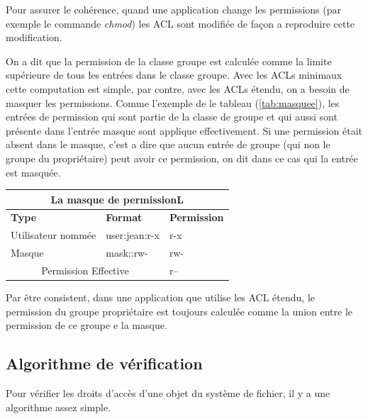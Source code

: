  
Pour assurer le cohérence, quand une application change les permissions (par exemple le commande \emph{chmod}) les ACL sont modifiée de façon a reproduire cette modification.
 
On a dit que la permission de la classe groupe est calculée comme la limite supérieure de tous les entrées dans le classe groupe. Avec les ACLs minimaux cette computation est simple, par contre, avec les ACLs étendu, on a besoin de masquer les permissions. Comme l'exemple de le tableau (\ref{tab:masquee}), les entrées de permission qui sont partie de la classe de groupe et qui aussi sont présente dans l'entrée masque sont applique effectivement. Si une permission était absent dans le masque, c'est a dire que aucun entrée de groupe (qui non le groupe du propriétaire) peut avoir ce permission, on dit dans ce cas qui la entrée est masquée.
 
\begin{center}
\begin{tabular}{|l|l|l|}
  \hline
    \multicolumn{3}{|c|}{La masque de permissionL} \\
  \hline
\textbf{Type} & \textbf{Format} & \textbf{Permission} \\
  \hline
Utilisateur nommée & user:jean:r-x & r-x\\
  \hline
Masque & mask::rw- & rw-\\
  \hline
\multicolumn{2}{|c|}{Permission Effective} & r--\\
  \hline
\end{tabular}
\label{tab:masque}
\end{center}


Par être consistent, dans une application que utilise les ACL étendu, le permission du groupe propriétaire est toujours calculée comme la union entre le permission de ce groupe e la masque.  
 
\subsection*{Algorithme de vérification}
 
Pour vérifier les droits d'accès d'une objet du système de fichier, il y a une algorithme assez simple.
 
